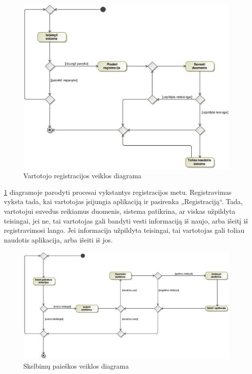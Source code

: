 \documentclass[12pt]{article}
\begin{document}
	\begin{figure}[h]
		\begin{center}
			\includegraphics[width=\textwidth]{RegistracijosVeikla.eps}
			\caption{Vartotojo registracijos veiklos diagrama\label{RegisterActivity}}
		\end{center}
	\end{figure}
	
	\ref{RegisterActivity} diagramoje parodyti procesai vykstantys registracijos metu. Registravimas vyksta tada, kai vartotojas įsijungia aplikaciją ir pasirenka „Registraciją“. Tada, vartotojui suvedus reikiamus duomenis, sistema patikrina, ar viskas užpildyta teisingai, jei ne, tai vartotojas gali bandyti vesti informaciją iš naujo, arba išeitį iš registravimosi lango. Jei informacija užpildyta teisingai, tai vartotojas gali toliau naudotis aplikacija, arba išeiti iš jos.
	\pagebreak
	
	\begin{figure}[h]
		\begin{center}
			\includegraphics[width=\textwidth]{PaieskosVeikla.eps}
			\caption{Skelbimų paieškos veiklos diagrama\label{SearchActivity}}
		\end{center}
	\end{figure}
	
\end{document}
